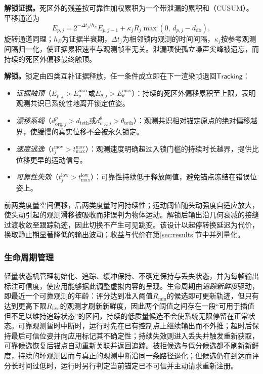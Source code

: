 \documentclass[review]{vgtc}
\begin{document}
\textbf{解锁证据。}死区外的残差按可靠性加权累积为一个带泄漏的累积和（CUSUM）。平移通道为
\begin{equation}
E_{p,j} = 2^{-\Delta t_j / h_E} E_{p,j-1} + \kappa_j R_j \max\!\left(0,\, d_{p,j} - d_{\mathrm{db}}\right),
\label{eq:cusum}
\end{equation}
旋转通道同理；$h_E$为证据半衰期，$\Delta t_j$为相邻锁内观测的时间间隔，$\kappa_j$按参考观测间隔归一化，使证据累积速率与观测帧率无关。泄漏项使孤立噪声尖峰被遗忘，而持续的死区外偏移最终触顶。

\textbf{解锁。}锁定由四类互补证据释放，任一条件成立即在下一渲染帧退回$\mathsf{Tracking}$：

\begin{itemize}[nosep,leftmargin=1.2em]
  \item \emph{证据触顶}（$E_{p,j} > E_p^{\max}$或$E_{\theta,j} > E_\theta^{\max}$）：持续的死区外偏移累积至上限，表明观测共识已系统性地离开锁定位姿。
  \item \emph{漂移系绳}（$d^{p}_{\mathrm{org},j} > d_{\mathrm{teth}}$或$d^{\theta}_{\mathrm{org},j} > \theta_{\mathrm{teth}}$）：观测共识相对锚定原点的绝对偏移越界，使缓慢的真实位移不会被永久锁定。
  \item \emph{速度逃逸}（$t_j^{\mathrm{mov}} > t^{\mathrm{mov}}_{\max}$）：观测速度明确超过入锁门槛的持续时长越界，提供比位移更早的运动信号。
  \item \emph{可靠性失效}（$t_j^{\mathrm{low}} > t^{\mathrm{low}}_{\max}$）：可靠性持续低于释放阈值，避免锚点冻结在错误位姿上。
\end{itemize}

前两类度量空间偏移，后两类度量时间持续性；运动阈值随头动强度自适应放大，使头动引起的观测滑移被吸收而非误判为物体运动。解锁后输出沿几何衰减的接缝过渡收敛至跟踪轨迹，因此切换不产生可见跳变。该设计以起停转换延迟为代价，换取静止期显著降低的输出波动；收益与代价在第\ref{sec:results}节中并列量化。

\subsubsection{生命周期管理}\label{sec:lifecycle}

轻量状态机管理初始化、追踪、缓冲保持、不确定保持与丢失状态，并为每帧输出标注可信度，使应用能够据此调整虚拟内容的呈现。生命周期由\emph{追踪新鲜度}驱动，即最近一个可靠观测的年龄：评分达到准入阈值$R_{\min}$的候选即可更新轨迹，但只有达到更高下限$R_{\mathrm{live}}$的观测才刷新新鲜度，因此两个阈值之间存在一段“可用于插值但不足以维持追踪状态”的区间，持续的低质量候选不会使系统无限停留在正常状态。可靠观测暂时中断时，运行时先在已有控制点上继续输出而不外推；超时后保持最后可信位姿并向应用标记其不确定性；持续失效则进入丢失并触发重新获取，可靠候选恢复后锚点自动重新关联并返回追踪。被拒候选与低分候选都不刷新新鲜度，持续的坏观测因而与真正的观测中断沿同一条路径退化；但候选仍在到达而评分长时间过低时，运行时另行判定当前锚定已不可信并主动请求重新注册。
\end{document}
